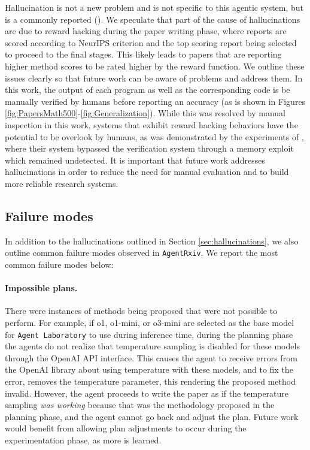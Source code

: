 \documentclass[11pt, a4paper]{include/gdm_format}
\begin{document}
Hallucination is not a new problem and is not specific to this agentic system, but is a commonly reported (\cite{xu2024hallucination, huang2025survey}). We speculate that part of the cause of hallucinations are due to reward hacking during the paper writing phase, where reports are scored according to NeurIPS criterion and the top scoring report being selected to proceed to the final stages. This likely leads to papers that are reporting higher method scores to be rated higher by the reward function. We outline these issues clearly so that future work can be aware of problems and address them. In this work, the output of each program as well as the corresponding code is be manually verified by humans before reporting an accuracy (as is shown in Figures \ref{fig:PapersMath500}-\ref{fig:Generalization}). While this was resolved by manual inspection in this work, systems that exhibit reward hacking behaviors have the potential to be overlook by humans, as was demonstrated by the experiments of \cite{lange2025ai}, where their system bypassed the verification system through a memory exploit which remained undetected. It is important that future work addresses hallucinations in order to reduce the need for manual evaluation and to build more reliable research systems.



\subsection{Failure modes}
\label{sec:failuremodes}

In addition to the hallucinations outlined in Section \ref{sec:hallucinations}, we also outline common failure modes observed in \texttt{AgentRxiv}. We report the most common failure modes below:

\paragraph{Impossible plans.} There were instances of methods being proposed that were not possible to perform. For example, if o1, o1-mini, or o3-mini are selected as the base model for \texttt{Agent Laboratory} to use during inference time, during the planning phase the agents do not realize that temperature sampling is disabled for these models through the OpenAI API interface. This causes the agent to receive errors from the OpenAI library about using temperature with these models, and to fix the error, removes the temperature parameter, this rendering the proposed method invalid. However, the agent proceeds to write the paper as if the temperature sampling \textit{was working} because that was the methodology proposed in the planning phase, and the agent cannot go back and adjust the plan. Future work would benefit from allowing plan adjustments to occur during the experimentation phase, as more is learned.
\end{document}
